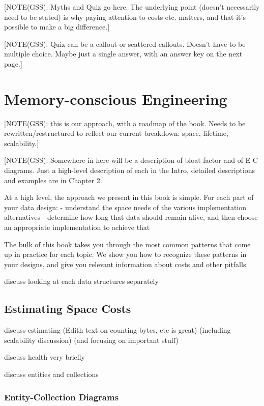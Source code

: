 [NOTE(GSS): Myths and Quiz go here. 
The underlying point (doesn't necessarily need to be stated) is why paying
attention to costs etc. matters, and that it's possible to make a big difference.]

[NOTE(GSS): Quiz can be a callout or scattered callouts.
Doesn't have to be multiple choice. Maybe just a single answer, with
an answer key on the next page.]

\section{Memory-conscious Engineering}

[NOTE(GSS): this is our approach, with a roadmap of the book.
Needs to be rewritten/restructured to reflect our current breakdown: space,
lifetime, scalability.]

[NOTE(GSS): Somewhere in here will be a description of bloat factor and of E-C
diagrams.  Just a high-level description of each in the Intro, detailed
descriptions and examples are in Chapter 2.]

At a high level, the approach we present in this book is simple. For each part of your data design:
- understand the space needs of the various implementation alternatives
- determine how long that data should remain alive, and then choose an appropriate implementation to achieve that

The bulk of this book takes you through the most common patterns that come up in
practice for each topic. We show you how to recognize these patterns in your
designs, and give you relevant information about costs and other pitfalls.

discuss looking at each data structures separately

\subsection{Estimating Space Costs}

discuss estimating (Edith text on counting bytes, etc is great) (including
scalability discussion) (and focusing on important stuff)

discuss health very briefly

discuss entities and collections

\subsubsection{Entity-Collection Diagrams}


